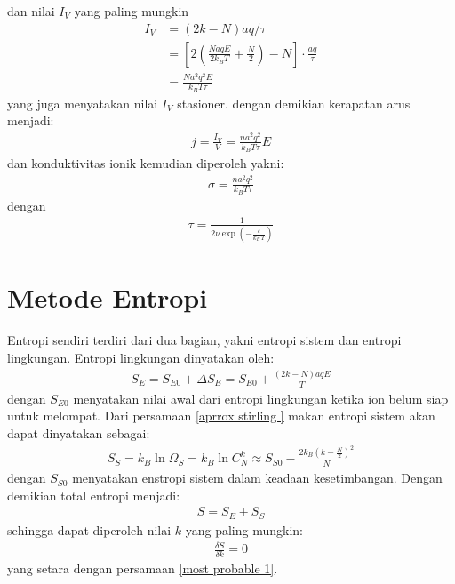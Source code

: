 \documentclass[a4paper , 12pt, cc]{article}
\begin{document}
dan nilai $I_V$ yang paling mungkin
\begin{align}
I_V  &= ( 2k -N ) aq /\tau \nonumber \\ 
& =\left[ 2 \left( \frac{NaqE}{2 k_B T} + \frac{N}{2} \right)   - N \right] \cdot \frac{aq}{\tau} \nonumber \\ 
&= \frac{Na^2 q^2 E}{k_B  T \tau} 
\end{align}
yang juga menyatakan nilai $I_V$ stasioner. dengan demikian kerapatan arus  menjadi:
\begin{align}
 j = \frac{I_V}{V}  = \frac{n a^2  q^2 }{k_B  T\tau } E
 \end{align}
 dan konduktivitas ionik kemudian diperoleh yakni:
 \begin{align}
\boxed{ \sigma  =  \frac{n a^2  q^2 }{k_B  T \tau}}
 \end{align}
 dengan 
 \begin{align}
 \tau  = \frac{1}{2 \nu  \exp \left(  - \frac{\varepsilon}{k_B \, T}\right)} \nonumber
 \end{align}

\section{Metode Entropi}
Entropi sendiri terdiri dari dua bagian, yakni entropi sistem dan entropi lingkungan. Entropi lingkungan dinyatakan oleh:
\begin{align}
S_E  =  S_{E0 }  + \Delta S_E   = S_{E0}  + \frac{(2 k -N) aqE}{T}
\end{align}
dengan $S_{E0} $  menyatakan nilai awal dari entropi lingkungan  ketika ion belum siap untuk melompat. Dari  persamaan \ref{aprrox stirling	} makan entropi sistem akan dapat dinyatakan sebagai:
\begin{align}
S_S  =  k_B \ln  \Omega_S =  k_B \ln C_N^k  \approx  S_{S0}  - \frac{2 k_B ( k - \frac{N}{2})^2}{N}  \label{entropi sistem}
\end{align}
dengan $S_{S0}$ menyatakan enstropi sistem dalam keadaan kesetimbangan.  Dengan demikian total entropi menjadi:
\begin{align}
S = S_E + S_S 
\end{align}
sehingga dapat diperoleh nilai $k$ yang paling mungkin:
\begin{align}
\frac{\delta S}{\delta k} = 0 
\end{align}
yang setara dengan persamaan \ref{most probable 1}. 
\end{document}
